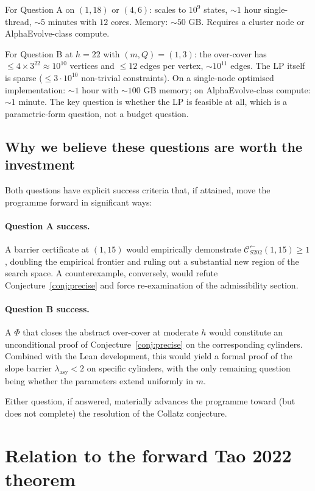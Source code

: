 \documentclass[11pt,a4paper]{article}
\theoremstyle{plain}
\theoremstyle{definition}
\newcommand{\Cback}{\mathcal{C}^{\!\leftarrow}_{S202}}
\begin{document}
For Question A on $(1, 18)$ or $(4, 6)$: scales to $10^9$ states,
$\sim 1$ hour single-thread, $\sim 5$ minutes with $12$ cores.
Memory: $\sim 50$ GB. Requires a cluster node or AlphaEvolve-class
compute.

For Question B at $h = 22$ with $(m, Q) = (1, 3)$: the over-cover
has $\le 4 \times 3^{22} \approx 10^{10}$ vertices and $\le 12$
edges per vertex, $\sim 10^{11}$ edges. The LP itself is sparse
($\le 3 \cdot 10^{10}$ non-trivial constraints). On a single-node
optimised implementation: $\sim 1$ hour with $\sim 100$ GB
memory; on AlphaEvolve-class compute: $\sim 1$ minute. The key
question is whether the LP is feasible at all, which is a
parametric-form question, not a budget question.

\subsection{Why we believe these questions are worth the
investment}

Both questions have explicit success criteria that, if attained,
move the programme forward in significant ways:

\paragraph{Question A success.}
A barrier certificate at $(1, 15)$ would empirically demonstrate
$\Cback(1, 15) \ge 1$, doubling the empirical frontier and
ruling out a substantial new region of the search space. A
counterexample, conversely, would refute
Conjecture~\ref{conj:precise} and force re-examination of the
admissibility section.

\paragraph{Question B success.}
A $\Phi$ that closes the abstract over-cover at moderate $h$ would
constitute an unconditional proof of
Conjecture~\ref{conj:precise} on the corresponding cylinders.
Combined with the Lean development, this would yield a
formal proof of the slope barrier $\lambda_{\mathrm{asy}} < 2$ on
specific cylinders, with the only remaining question being
whether the parameters extend uniformly in $m$.

Either question, if answered, materially advances the programme
toward (but does not complete) the resolution of the Collatz
conjecture.

\section{Relation to the forward Tao 2022 theorem}
\label{sec:relation-tao}
\end{document}
